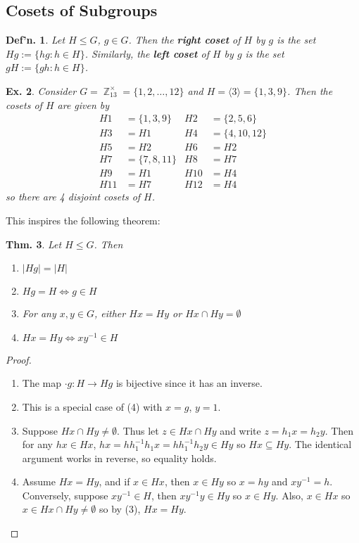 \documentclass[12pt, a4paper]{book}
\DeclareMathOperator{\Z}{\mathbb{Z}}
\newtheorem{theorem}{Thm.}[section]
\newtheorem{definition}[theorem]{Def'n.}
\newtheorem{example}[theorem]{Ex.}
\theoremstyle{nonumberplain}
\newtheorem{proof}{Proof}
\begin{document}
\subsection{Cosets of Subgroups}
\begin{definition}
    Let $H\leq G$, $g\in G$.
    Then the \textbf{right coset} of $H$ by $g$ is the set $Hg:=\{hg:h\in H\}$.
    Similarly, the \textbf{left coset} of $H$ by $g$ is the set $gH:=\{gh:h\in H\}$.
\end{definition}
\begin{example}
    Consider $G=\Z_{13}^\times=\{1,2,\ldots,12\}$ and $H=\langle 3\rangle=\{1,3,9\}$.
    Then the cosets of $H$ are given by
    \begin{align*}
        H1 &= \{1,3,9\} & H2 &= \{2,5,6\}\\
        H3 &= H1 & H4 &= \{4,10,12\}\\
        H5 &= H2 & H6 &= H2\\
        H7 &= \{7,8,11\} & H8 &= H7\\
        H9 &= H1 & H10 &= H4\\
        H11 &= H7 & H12 &= H4
    \end{align*}
    so there are 4 disjoint cosets of $H$.
\end{example}
This inspires the following theorem:
\begin{theorem}
    Let $H\leq G$.
    Then
    \begin{enumerate}[nolistsep]
        \item $|Hg|=|H|$
        \item $Hg=H\Leftrightarrow g\in H$
        \item For any $x,y\in G$, either $Hx=Hy$ or $Hx\cap Hy=\emptyset$
        \item $Hx=Hy\Leftrightarrow xy^{-1}\in H$
    \end{enumerate}
\end{theorem}
\begin{proof}
    \begin{enumerate}
        \item The map $\cdot g:H\to Hg$ is bijective since it has an inverse.
        \item This is a special case of (4) with $x=g$, $y=1$.
        \item Suppose $Hx\cap Hy\neq\emptyset$.
            Thus let $z\in Hx\cap Hy$ and write $z=h_1x=h_2y$.
            Then for any $hx\in Hx$, $hx=hh_1^{-1}h_1x=hh_1^{-1}h_2y\in Hy$ so $Hx\subseteq Hy$.
            The identical argument works in reverse, so equality holds.
        \item Assume $Hx=Hy$, and if $x\in Hx$, then $x\in Hy$ so $x=hy$ and $xy^{-1}=h$.
            Conversely, suppose $xy^{-1}\in H$, then $xy^{-1}y\in Hy$ so $x\in Hy$.
            Also, $x\in Hx$ so $x\in Hx\cap Hy\neq\emptyset$ so by (3), $Hx=Hy$.
    \end{enumerate}
\end{proof}
\end{document}

